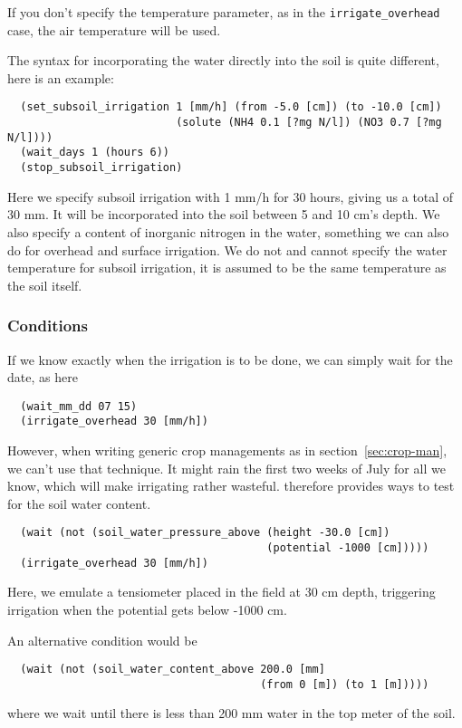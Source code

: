 \documentclass[a4paper,11pt]{article}
\begin{document}
If you don't specify the temperature parameter, as in the
\texttt{irrigate\_overhead} case, the air temperature will be used.

The syntax for incorporating the water directly into the soil is
quite different, here is an example:
\begin{verbatim}
  (set_subsoil_irrigation 1 [mm/h] (from -5.0 [cm]) (to -10.0 [cm])
                          (solute (NH4 0.1 [?mg N/l]) (NO3 0.7 [?mg N/l])))
  (wait_days 1 (hours 6))
  (stop_subsoil_irrigation)
\end{verbatim}
Here we specify subsoil irrigation with 1 mm/h for 30 hours, giving us
a total of 30 mm.  It will be incorporated into the soil between 5 and
10 cm's depth.  We also specify a content of inorganic nitrogen in the
water, something we can also do for overhead and surface irrigation.
We do not and cannot specify the water temperature for subsoil
irrigation, it is assumed to be the same temperature as the soil
itself.

\subsubsection{Conditions}

If we know exactly when the irrigation is to be done, we can simply
wait for the date, as here
\begin{verbatim}
  (wait_mm_dd 07 15)
  (irrigate_overhead 30 [mm/h])
\end{verbatim}

However, when writing generic crop managements as in
section~\ref{sec:crop-man}, we can't use that technique.  It might
rain the first two weeks of July for all we know, which will make
irrigating rather wasteful.  \Daisy{} therefore provides ways to test
for the soil water content.
\begin{verbatim}
  (wait (not (soil_water_pressure_above (height -30.0 [cm])
                                        (potential -1000 [cm]))))
  (irrigate_overhead 30 [mm/h])
\end{verbatim}
Here, we emulate a tensiometer placed in the field at 30 cm depth,
triggering irrigation when the potential gets below -1000 cm.


An alternative condition would be
\begin{verbatim}
  (wait (not (soil_water_content_above 200.0 [mm] 
                                       (from 0 [m]) (to 1 [m]))))
\end{verbatim}
where we wait until there is less than 200 mm water in the top meter
of the soil. 
\end{document}
